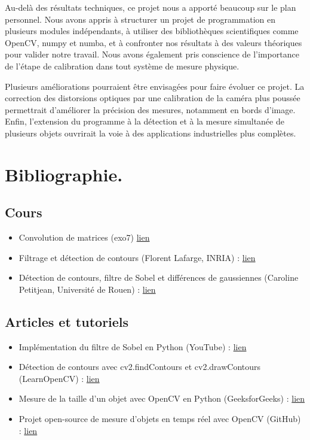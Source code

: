 \documentclass[titlepage]{article}
\begin{document}
	Au-delà des résultats techniques, ce projet nous a apporté beaucoup sur le plan personnel. Nous avons appris à structurer un projet de programmation en plusieurs modules indépendants, à utiliser des bibliothèques scientifiques comme OpenCV, numpy et numba, et à confronter nos résultats à des valeurs théoriques pour valider notre travail. Nous avons également pris conscience de l'importance de l'étape de calibration dans tout système de mesure physique.
	
	Plusieurs améliorations pourraient être envisagées pour faire évoluer ce projet. La correction des distorsions optiques par une calibration de la caméra plus poussée permettrait d'améliorer la précision des mesures, notamment en bords d'image. Enfin, l'extension du programme à la détection et à la mesure simultanée de plusieurs objets ouvrirait la voie à des applications industrielles plus complètes.
\section{Bibliographie.}
\subsection{Cours}
\begin{itemize}
	\item Convolution de matrices (exo7)
	\href{https://exo7math.github.io/deepmath-exo7/convolution2d/convolution2d.pdf}{lien}
	\item Filtrage et détection de contours (Florent Lafarge, INRIA) : \href{https://www-sop.inria.fr/members/Florent.Lafarge/cours/ENS_course_2.pdf}{lien}
	\item Détection de contours, filtre de Sobel et différences de gaussiennes (Caroline Petitjean, Université de Rouen) : \href{http://carolinepetitjean.free.fr/enseignements/ti/cours3_M1_Petitjean.pdf}{lien}
\end{itemize}

\subsection{Articles et tutoriels}
\begin{itemize}
	\item Implémentation du filtre de Sobel en Python (YouTube) : \href{https://www.youtube.com/watch?v=8ugtP_8jri4}{lien}
	\item Détection de contours avec cv2.findContours et cv2.drawContours (LearnOpenCV) : \href{https://learnopencv.com/contour-detection-using-opencv-python-c/}{lien}
	\item Mesure de la taille d'un objet avec OpenCV en Python (GeeksforGeeks) : \href{https://www.geeksforgeeks.org/python/measure-size-of-an-object-using-python-opencv/}{lien}
	\item Projet open-source de mesure d'objets en temps réel avec OpenCV (GitHub) : \href{https://github.com/mishrakushal/real-time-object-measurement}{lien}
\end{itemize}
\end{document}
